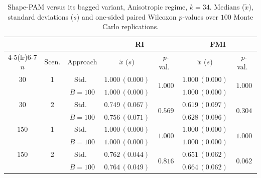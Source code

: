 \documentclass[11pt,a4paper]{article}
\begin{document}
\begin{table}[h]
\centering
\caption{Shape-PAM versus its bagged variant, Anisotropic regime, $k=34$. Medians ($\tilde x$), standard deviations ($s$) and one-sided paired Wilcoxon $p$-values over $100$ Monte Carlo replications.}
\label{tab:pam-aniso-k34}
\footnotesize
\begin{tabular}{cc c cc cc}
\toprule
& & & \multicolumn{2}{c}{\textbf{RI}} & \multicolumn{2}{c}{\textbf{FMI}} \\
\cmidrule(lr){4-5}\cmidrule(lr){6-7}
$n$ & Scen. & Approach & $\tilde x$ ($s$) & $p$-val.\ & $\tilde x$ ($s$) & $p$-val.\ \\
\midrule
$30$ & 1 & Std.\ & $1.000\,(0.000)$ & \multirow{2}{*}{$1.000$} & $1.000\,(0.000)$ & \multirow{2}{*}{$1.000$} \\
     &   & $B{=}100$ & $1.000\,(0.000)$ & & $1.000\,(0.000)$ & \\
$30$ & 2 & Std.\ & $0.749\,(0.067)$ & \multirow{2}{*}{$0.569$} & $0.619\,(0.097)$ & \multirow{2}{*}{$0.304$} \\
     &   & $B{=}100$ & $0.756\,(0.071)$ & & $0.628\,(0.096)$ & \\
$150$ & 1 & Std.\ & $1.000\,(0.000)$ & \multirow{2}{*}{$1.000$} & $1.000\,(0.000)$ & \multirow{2}{*}{$1.000$} \\
     &   & $B{=}100$ & $1.000\,(0.000)$ & & $1.000\,(0.000)$ & \\
$150$ & 2 & Std.\ & $0.762\,(0.044)$ & \multirow{2}{*}{$0.816$} & $0.651\,(0.062)$ & \multirow{2}{*}{$0.062$} \\
     &   & $B{=}100$ & $0.764\,(0.049)$ & & $0.664\,(0.062)$ & \\
\bottomrule
\end{tabular}
\end{table}
\end{document}
